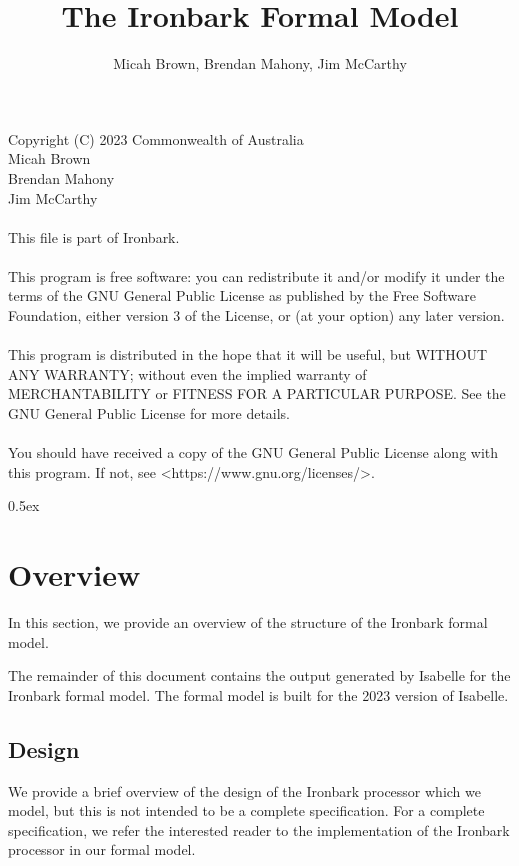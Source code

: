 \documentclass[11pt,a4paper]{article}
\begin{document}
\title{The Ironbark Formal Model}
\author{Micah Brown, Brendan Mahony, Jim McCarthy}
\maketitle

\noindent Copyright (C) 2023 Commonwealth of Australia\\
\indent Micah Brown\\
\indent Brendan Mahony\\
\indent Jim McCarthy\\
\\
This file is part of Ironbark.\\
\\
This program is free software: you can redistribute it and/or modify it under the terms of the GNU General Public License as published by the Free Software Foundation, either version 3 of the License, or (at your option) any later version.\\
\\
This program is distributed in the hope that it will be useful, but WITHOUT ANY WARRANTY; without even the implied warranty of MERCHANTABILITY or FITNESS FOR A PARTICULAR PURPOSE. See the GNU General Public License for more details.\\
\\
You should have received a copy of the GNU General Public License along with this program. If not, see <https://www.gnu.org/licenses/>.

\tableofcontents

\parindent 0pt\parskip 0.5ex

\newpage

\newpage

\section{Overview}
In this section, we provide an overview of the structure of the Ironbark formal model.

The remainder of this document contains the output generated by Isabelle for the Ironbark formal model. The formal model is built for the 2023 version of Isabelle.

\subsection{Design}
We provide a brief overview of the design of the Ironbark processor which we model, but this is not intended to be a complete specification. For a complete specification, we refer the interested reader to the implementation of the Ironbark processor in our formal model.
\end{document}
